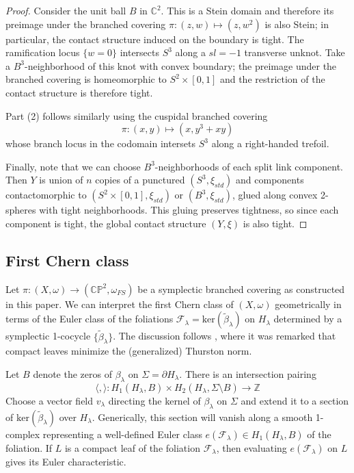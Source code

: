 \documentclass[11pt]{amsart}
\theoremstyle{definition}
\theoremstyle{remark}
\numberwithin{equation}{section}
\newcommand{\ZZ}{\mathbb{Z}}
\newcommand{\betat}{\widetilde{\beta}}
\newcommand{\cF}{\mathcal{F}}
\newcommand{\CC}{\mathbb{C}}
\newcommand{\CP}{\mathbb{CP}}
\begin{document}
\begin{proof}
Consider the unit ball $B$ in $\CC^2$.  This is a Stein domain and therefore its preimage under the branched covering $\pi: (z,w) \mapsto (z,w^2)$ is also Stein; in particular, the contact structure induced on the boundary is tight.  The ramification locus $\{w = 0\}$ intersects $S^3$ along a $sl = -1$ transverse unknot.  Take a $B^3$-neighborhood of this knot with convex boundary; the preimage under the branched covering is homeomorphic to $S^2 \times [0,1]$ and the restriction of the contact structure is therefore tight.  

Part (2) follows similarly using the cuspidal branched covering
\[\pi: (x,y) \mapsto (x, y^3 + xy)\]
whose branch locus in the codomain intersets $S^3$ along a right-handed trefoil.

Finally, note that we can choose $B^3$-neighborhoods of each split link component.  Then $Y$ is union of $n$ copies of a punctured $(S^3,\xi_{std})$ and components contactomorphic to $(S^2 \times [0,1],\xi_{std})$ or $(B^3,\xi_{std})$, glued along convex 2-spheres with tight neighborhoods.  This gluing preserves tightness, so since each component is tight, the global contact structure $(Y,\xi)$ is also tight.
\end{proof}

\subsection{First Chern class}

Let $\pi: (X,\omega) \rightarrow (\CP^2,\omega_{FS})$ be a symplectic branched covering as constructed in this paper.   We can interpret the first Chern class of $(X,\omega)$ geometrically in terms of the Euler class of the foliations $\cF_{\lambda} = \text{ker}(\betat_{\lambda})$ on $H_{\lambda}$ determined by a symplectic 1-cocycle $\{\betat_{\lambda}\}$.  The discussion follows \cite[Section 3]{LC-symp-cocycle}, where it was remarked that compact leaves minimize the (generalized) Thurston norm.

Let $B$ denote the zeros of $\beta_{\lambda}$ on $\Sigma = \partial H_{\lambda}$.  There is an intersection pairing
\[ \langle , \rangle: H_1(H_{\lambda},B) \times H_2(H_{\lambda}, \Sigma \setminus B) \rightarrow \ZZ \]
Choose a vector field $v_{\lambda}$ directing the kernel of $\beta_{\lambda}$ on $\Sigma$ and extend it to a section of $\text{ker}(\betat_{\lambda})$ over $H_{\lambda}$.  Generically, this section will vanish along a smooth 1-complex representing a well-defined Euler class $e(\cF_{\lambda}) \in H_1(H_{\lambda},B)$ of the foliation.  If $L$ is a compact leaf of the foliation $\cF_{\lambda}$, then evaluating $e(\cF_{\lambda})$ on $L$ gives its Euler characteristic.
\end{document}
